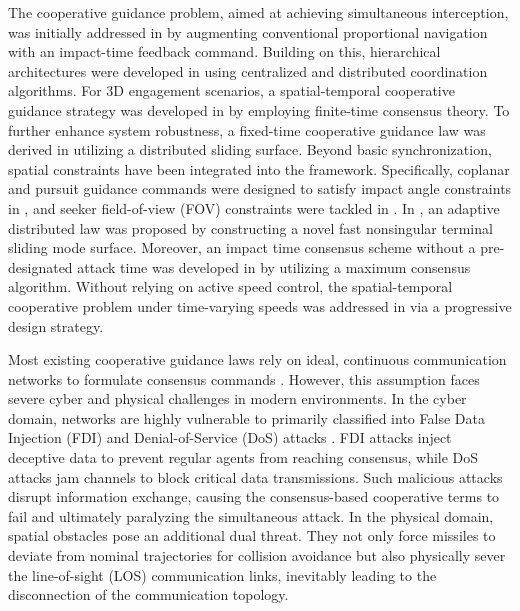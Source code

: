 \documentclass[lettersize,journal]{IEEEtran}
\begin{document}
The cooperative guidance problem, aimed at achieving simultaneous interception, was initially addressed in \cite{jeon2006impact} by augmenting conventional proportional navigation with an impact-time feedback command. Building on this, hierarchical architectures were developed in \cite{shiyu2008cooperative} using centralized and distributed coordination algorithms. For 3D engagement scenarios, a spatial-temporal cooperative guidance strategy was developed in \cite{zhang2020finite} by employing finite-time consensus theory. To further enhance system robustness, a fixed-time cooperative guidance law was derived in \cite{chen2021three} utilizing a distributed sliding surface. Beyond basic synchronization, spatial constraints have been integrated into the framework. Specifically, coplanar and pursuit guidance commands were designed to satisfy impact angle constraints in \cite{wang2022impact}, and seeker field-of-view (FOV) constraints were tackled in \cite{dong2021three}. In \cite{yu2022three}, an adaptive distributed law was proposed by constructing a novel fast nonsingular terminal sliding mode surface. Moreover, an impact time consensus scheme without a pre-designated attack time was developed in \cite{yu2023impact} by utilizing a maximum consensus algorithm. Without relying on active speed control, the spatial-temporal cooperative problem under time-varying speeds was addressed in \cite{dong2023three} via a progressive design strategy. 

Most existing cooperative guidance laws rely on ideal, continuous communication networks to formulate consensus commands \cite{chen2021three, zhang2020finite, dong2021three, wang2022impact, yu2022three, yu2023impact, dong2023three}. However, this assumption faces severe cyber and physical challenges in modern environments. In the cyber domain, networks are highly vulnerable to primarily classified into False Data Injection (FDI) \cite{7438916,9740500,11119720} and Denial-of-Service (DoS) attacks \cite{8444973, 2022An, 10551485}. FDI attacks inject deceptive data to prevent regular agents from reaching consensus, while DoS attacks jam channels to block critical data transmissions. Such malicious attacks disrupt information exchange, causing the consensus-based cooperative terms to fail and ultimately paralyzing the simultaneous attack. In the physical domain, spatial obstacles pose an additional dual threat. They not only force missiles to deviate from nominal trajectories for collision avoidance but also physically sever the line-of-sight (LOS) communication links, inevitably leading to the disconnection of the communication topology.
\end{document}
